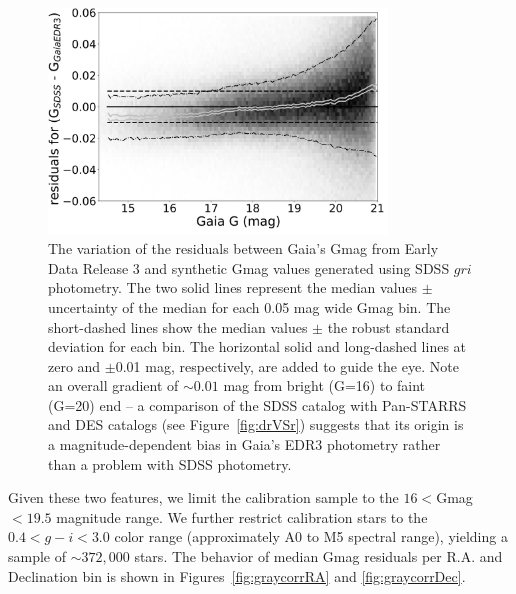 \documentclass[fleqn,usenatbib]{mnras}
\begin{document}
\begin{figure}[th!]
    \centering\includegraphics[width=9cm]{figures/GmagCorrectionTest_Gmag_Hess.png} 
\caption{The variation of the residuals between Gaia's Gmag from Early Data Release 3
and synthetic Gmag values generated using SDSS $gri$ photometry. The two solid 
lines represent the median values $\pm$ uncertainty of the median for each
0.05 mag wide Gmag bin. The short-dashed lines show the median values $\pm$ 
the robust standard deviation for each bin. The horizontal solid and long-dashed 
lines at zero and $\pm$0.01 mag, respectively, are added to guide the eye.
Note an overall gradient of $\sim0.01$ mag from bright (G=16) to faint (G=20) 
end -- a comparison of the SDSS catalog with Pan-STARRS and DES catalogs (see 
Figure~\ref{fig:drVSr}) suggests that its origin is a magnitude-dependent bias in
 Gaia's EDR3 photometry rather than a problem with SDSS photometry.}
\label{fig:gaiaJump}
\end{figure}


Given these two features, we limit the calibration sample to the $16<$Gmag$<19.5$
magnitude range. We further restrict calibration stars to the $0.4 < g-i < 3.0$ color 
range (approximately A0 to M5 spectral range), yielding a sample of $\sim372,000$ stars. 
The behavior of median Gmag residuals per R.A. and Declination bin is shown in 
Figures~\ref{fig:graycorrRA} and \ref{fig:graycorrDec}. 
\end{document}
